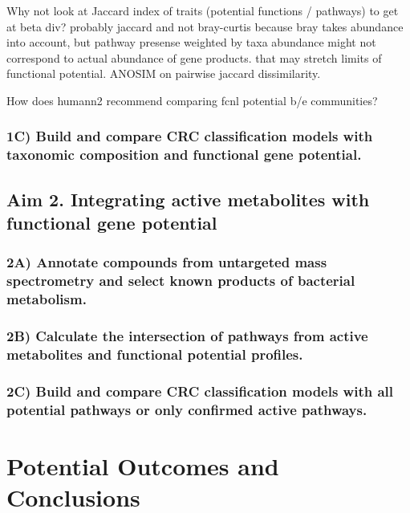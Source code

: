 \documentclass[11pt]{article}
\begin{document}
Why not look at Jaccard index of traits (potential functions / pathways) to get at beta div?
probably jaccard and not bray-curtis because bray takes abundance into account, but pathway presense weighted by taxa abundance might not correspond to actual abundance of gene products. that may stretch limits of functional potential.
ANOSIM on pairwise jaccard dissimilarity.

How does humann2 recommend comparing fcnl potential b/e communities?

\subsubsection*{1C) Build and compare CRC classification models with taxonomic composition and functional gene potential.}


\subsection*{Aim 2. Integrating active metabolites with functional gene potential}

\subsubsection*{2A) Annotate compounds from untargeted mass spectrometry and select known products of bacterial metabolism.}

\subsubsection*{2B) Calculate the intersection of pathways from active metabolites and functional potential profiles.}

\subsubsection*{2C) Build and compare CRC classification models with all potential pathways or only confirmed active pathways.}


\section*{Potential Outcomes and Conclusions}


\pagebreak
\footnotesize{

\par}
\end{document}
